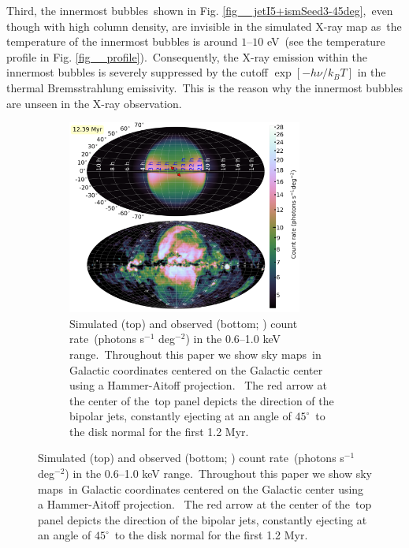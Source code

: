 \documentclass[fleqn,usenatbib,useAMS]{mnras}
\begin{document}
  Third, the innermost bubbles\
  shown in Fig. \ref{fig__jetI5+ismSeed3-45deg},\
  even though with high column density, are invisible in the simulated X-ray map as\
  the temperature of the innermost bubbles is around $1$--$10$ eV\
  (see the temperature profile in Fig. \ref{fig__profile}).\
  Consequently, the X-ray emission within the innermost bubbles
  is severely suppressed by the cutoff $\exp\left[-h\nu/k_{B}T\right]$ in the thermal Bremsstrahlung emissivity.\
  This is the reason why the innermost bubbles are unseen in the X-ray observation.



 \begin{figure}%
      \begin{subfigure}[t]{\textwidth}%
         \centering%
         \includegraphics[width=0.85\textwidth]{figures/fig__xraymap.png}%
         \caption{
               Simulated (top) and observed (bottom; \citealt{Predehl2020}) count rate\
               (photons s$^{-1}$ deg$^{-2}$) in the 0.6--1.0 keV range.\
               Throughout this paper we show sky maps\
               in Galactic coordinates centered on the Galactic center using a Hammer-Aitoff projection.\
               The red arrow at the center of the\
               top panel depicts the direction of the bipolar jets, constantly ejecting at an angle of $45^{\circ}$\
               to the disk normal for the first 1.2 Myr.
         }%
         \label{fig__xray_0.8keV_angle_000}%
         \end{subfigure}%
         \hspace{4pt}%

\end{figure}
\end{document}
